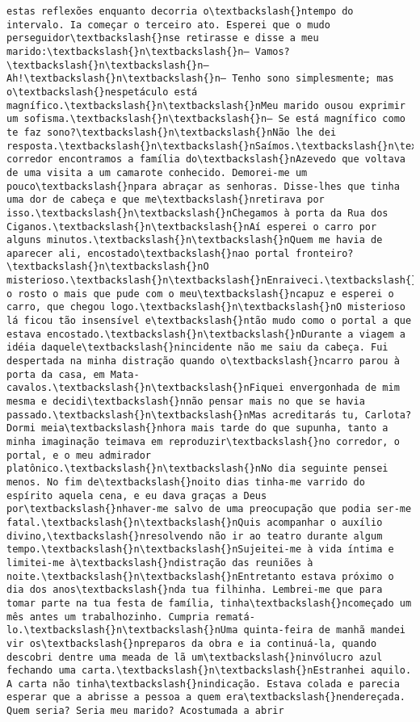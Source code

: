 \documentclass[11pt]{article}
\begin{document}
\begin{Verbatim}[commandchars=\\\{\}]
estas reflexões enquanto decorria o\textbackslash{}ntempo do intervalo. Ia começar o terceiro ato. Esperei que o mudo perseguidor\textbackslash{}nse retirasse e disse a meu marido:\textbackslash{}n\textbackslash{}n— Vamos?\textbackslash{}n\textbackslash{}n— Ah!\textbackslash{}n\textbackslash{}n— Tenho sono simplesmente; mas o\textbackslash{}nespetáculo está magnífico.\textbackslash{}n\textbackslash{}nMeu marido ousou exprimir um sofisma.\textbackslash{}n\textbackslash{}n— Se está magnífico como te faz sono?\textbackslash{}n\textbackslash{}nNão lhe dei resposta.\textbackslash{}n\textbackslash{}nSaímos.\textbackslash{}n\textbackslash{}nNo corredor encontramos a família do\textbackslash{}nAzevedo que voltava de uma visita a um camarote conhecido. Demorei-me um pouco\textbackslash{}npara abraçar as senhoras. Disse-lhes que tinha uma dor de cabeça e que me\textbackslash{}nretirava por isso.\textbackslash{}n\textbackslash{}nChegamos à porta da Rua dos Ciganos.\textbackslash{}n\textbackslash{}nAí esperei o carro por alguns minutos.\textbackslash{}n\textbackslash{}nQuem me havia de aparecer ali, encostado\textbackslash{}nao portal fronteiro?\textbackslash{}n\textbackslash{}nO misterioso.\textbackslash{}n\textbackslash{}nEnraiveci.\textbackslash{}n\textbackslash{}nCobri o rosto o mais que pude com o meu\textbackslash{}ncapuz e esperei o carro, que chegou logo.\textbackslash{}n\textbackslash{}nO misterioso lá ficou tão insensível e\textbackslash{}ntão mudo como o portal a que estava encostado.\textbackslash{}n\textbackslash{}nDurante a viagem a idéia daquele\textbackslash{}nincidente não me saiu da cabeça. Fui despertada na minha distração quando o\textbackslash{}ncarro parou à porta da casa, em Mata-cavalos.\textbackslash{}n\textbackslash{}nFiquei envergonhada de mim mesma e decidi\textbackslash{}nnão pensar mais no que se havia passado.\textbackslash{}n\textbackslash{}nMas acreditarás tu, Carlota? Dormi meia\textbackslash{}nhora mais tarde do que supunha, tanto a minha imaginação teimava em reproduzir\textbackslash{}no corredor, o portal, e o meu admirador platônico.\textbackslash{}n\textbackslash{}nNo dia seguinte pensei menos. No fim de\textbackslash{}noito dias tinha-me varrido do espírito aquela cena, e eu dava graças a Deus por\textbackslash{}nhaver-me salvo de uma preocupação que podia ser-me fatal.\textbackslash{}n\textbackslash{}nQuis acompanhar o auxílio divino,\textbackslash{}nresolvendo não ir ao teatro durante algum tempo.\textbackslash{}n\textbackslash{}nSujeitei-me à vida íntima e limitei-me à\textbackslash{}ndistração das reuniões à noite.\textbackslash{}n\textbackslash{}nEntretanto estava próximo o dia dos anos\textbackslash{}nda tua filhinha. Lembrei-me que para tomar parte na tua festa de família, tinha\textbackslash{}ncomeçado um mês antes um trabalhozinho. Cumpria rematá-lo.\textbackslash{}n\textbackslash{}nUma quinta-feira de manhã mandei vir os\textbackslash{}npreparos da obra e ia continuá-la, quando descobri dentre uma meada de lã um\textbackslash{}ninvólucro azul fechando uma carta.\textbackslash{}n\textbackslash{}nEstranhei aquilo. A carta não tinha\textbackslash{}nindicação. Estava colada e parecia esperar que a abrisse a pessoa a quem era\textbackslash{}nendereçada. Quem seria? Seria meu marido? Acostumada a abrir 
\end{Verbatim}
\end{document}
